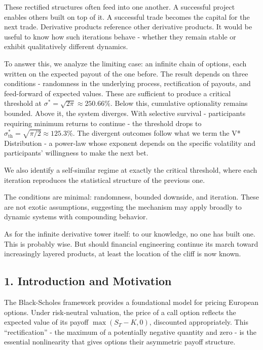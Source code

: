 \documentclass[
  11pt,
  openany]{article}
\begin{document}
These rectified structures often feed into one another. A successful
project enables others built on top of it. A successful trade becomes
the capital for the next trade. Derivative products reference other
derivative products. It would be useful to know how such iterations
behave - whether they remain stable or exhibit qualitatively different
dynamics.

To answer this, we analyze the limiting case: an infinite chain of
options, each written on the expected payout of the one before. The
result depends on three conditions - randomness in the underlying
process, rectification of payouts, and feed-forward of expected values.
These are sufficient to produce a critical threshold at
\(\sigma^* = \sqrt{2\pi} \approx 250.66\%\). Below this, cumulative
optionality remains bounded. Above it, the system diverges. With
selective survival - participants requiring minimum returns to continue
- the threshold drops to
\(\sigma_{\text{th}}^{*} = \sqrt{\pi/2} \approx 125.3\%\). The divergent
outcomes follow what we term the V* Distribution - a power-law whose
exponent depends on the specific volatility and participants'
willingness to make the next bet.

We also identify a self-similar regime at exactly the critical
threshold, where each iteration reproduces the statistical structure of
the previous one.

The conditions are minimal: randomness, bounded downside, and iteration.
These are not exotic assumptions, suggesting the mechanism may apply
broadly to dynamic systems with compounding behavior.

As for the infinite derivative tower itself: to our knowledge, no one
has built one. This is probably wise. But should financial engineering
continue its march toward increasingly layered products, at least the
location of the cliff is now known.

\subsection{1. Introduction and
Motivation}\label{introduction-and-motivation}

The Black-Scholes framework provides a foundational model for pricing
European options. Under risk-neutral valuation, the price of a call
option reflects the expected value of its payoff \(\max(S_T - K, 0)\),
discounted appropriately. This ``rectification'' - the maximum of a
potentially negative quantity and zero - is the essential nonlinearity
that gives options their asymmetric payoff structure.
\end{document}
